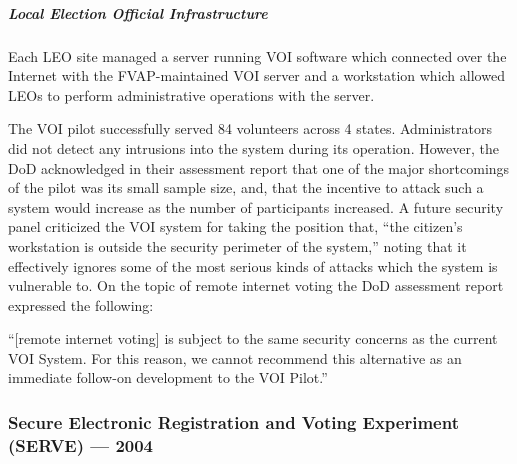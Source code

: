 \subparagraph{Local Election Official Infrastructure}
Each LEO site managed a server running VOI software which connected over the
Internet with the FVAP-maintained VOI server and a workstation which allowed
LEOs to perform administrative operations with the server.


The VOI pilot successfully served 84 volunteers across 4 states. Administrators
did not detect any intrusions into the system during its operation. However, the
DoD acknowledged in their assessment report that one of the major shortcomings
of the pilot was its small sample size, and, that the incentive to attack such a
system would increase as the number of participants
increased.\cite{voi-assessment-report} A future security panel criticized the
VOI system for taking the position that, ``the citizen's workstation is outside
the security perimeter of the system,'' noting that it effectively ignores some
of the most serious kinds of attacks which the system is vulnerable
to.\cite{serve-analysis} On the topic of remote internet voting the DoD
assessment report expressed the following:

\begin{displayquote}[][]
  ``[remote internet voting] is subject to the same security concerns as the
  current VOI System. For this reason, we cannot recommend this alternative as
  an immediate follow-on development to the VOI
  Pilot.\cite{voi-assessment-report}''
\end{displayquote}


\subsubsection{Secure Electronic Registration and Voting Experiment (SERVE) --- 2004}

